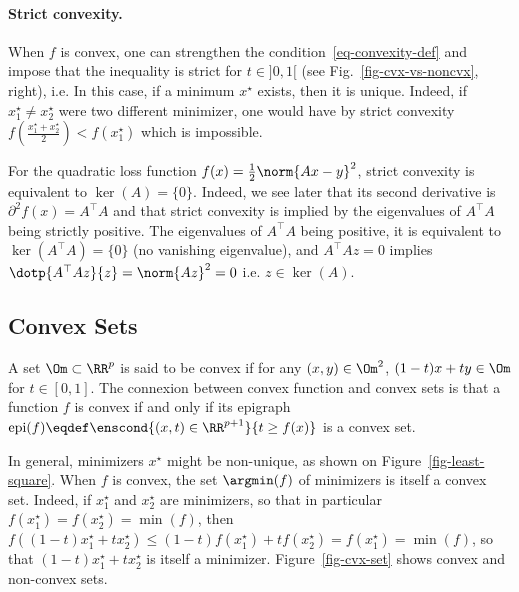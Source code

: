 \paragraph{Strict convexity.}

When $f$ is convex, one can strengthen the condition~\eqref{eq-convexity-def} and impose that the inequality is strict for $t \in ]0,1[$ (see Fig.~\ref{fig-cvx-vs-noncvx}, right), i.e.
\eql{\label{eq-strict-convexity-def}
	\foralls t \in ]0,1[, \quad
		f((1-t)x + t y) < (1-t)f(x) + t f(y).
}
In this case, if a minimum $x^\star$ exists, then it is unique.  Indeed, if $x_1^\star \neq x_2^\star$ were two different minimizer, one would have by strict convexity $f(\frac{x_1^\star+x_2^\star}{2}) < f(x_1^\star)$ which is impossible.

\begin{exmp}
	For the quadratic loss function $f(x)=\frac{1}{2}\norm{Ax-y}^2$, strict convexity is equivalent to $\ker(A)=\{0\}$.
	Indeed, we see later that its second derivative is $\partial^2 f(x)=A^\top A$ and that strict convexity is implied by the eigenvalues of $A^\top A$ being strictly positive. The eigenvalues of $A^\top A$ being positive, it is equivalent to $\ker(A^\top A)=\{0\}$ (no vanishing eigenvalue), and $A^\top A z = 0$ implies $\dotp{A^\top A z}{z}=\norm{Az}^2=0$ i.e. $z \in \ker(A)$.
\end{exmp}

\subsection{Convex Sets}

A set $\Om \subset \RR^p$ is said to be convex if for any $(x,y) \in \Om^2$, $(1-t)x + t y \in \Om$ for $t \in [0,1]$.
%
The connexion between convex function and convex sets is that a function $f$ is convex if and only if its epigraph $\text{epi}(f) \eqdef \enscond{(x,t) \in \RR^{p+1}}{t \geq f(x)}$ is a convex set. 

\begin{rem}
In general, minimizers $x^\star$ might be non-unique, as shown on Figure~\ref{fig-least-square}. 
%
When $f$ is convex, the set $\argmin(f)$ of minimizers is itself a convex set. 
%
Indeed, if $x_1^\star$ and $x_2^\star$ are minimizers, so that in particular $f(x_1^\star)=f(x_2^\star)=\min(f)$, then $f( (1-t)x_1^\star + t x_2^\star ) \leq (1-t) f(x_1^\star) + t f(x_2^\star) = f(x_1^\star) = \min(f)$, so that $(1-t)x_1^\star + t x_2^\star$ is itself a minimizer. Figure~\ref{fig-cvx-set} shows convex and non-convex sets. 
\end{rem}



